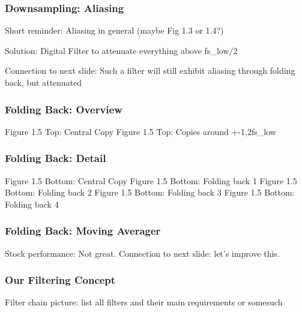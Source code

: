 \begin{frame}
    \frametitle{Downsampling: Aliasing}
    \begin{center}
        Short reminder: Aliasing in general (maybe Fig 1.3 or 1.4?)

        Solution: Digital Filter to attenuate everything above fs\_low/2

        Connection to next slide: Such a filter will still exhibit aliasing through folding back, but attenuated
    \end{center}
\end{frame}

\begin{frame}
    \frametitle{Folding Back: Overview}
    \begin{overprint}
            Figure 1.5 Top: Central Copy
            Figure 1.5 Top: Copies around +-{1,2}fs\_low
    \end{overprint}
\end{frame}

\begin{frame}
    \frametitle{Folding Back: Detail}

    \begin{overprint}
            Figure 1.5 Bottom: Central Copy
            Figure 1.5 Bottom: Folding back 1
            Figure 1.5 Bottom: Folding back 2
            Figure 1.5 Bottom: Folding back 3
            Figure 1.5 Bottom: Folding back 4
    \end{overprint}
\end{frame}

\begin{frame}
    \frametitle{Folding Back: Moving Averager}
    \begin{center}
        Stock performance: Not great. Connection to next slide: let's improve this.
    \end{center}
\end{frame}

\begin{frame}
    \frametitle{Our Filtering Concept}
    \begin{center}
        Filter chain picture: list all filters and their main requirements or somesuch
    \end{center}
\end{frame}

